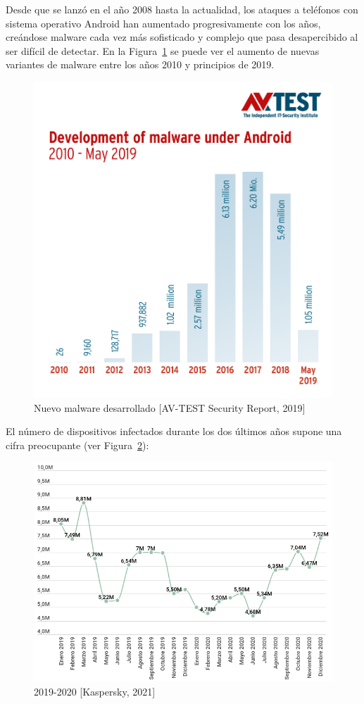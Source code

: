 Desde que se lanzó en el año 2008 hasta la actualidad, los ataques a teléfonos con sistema operativo Android han aumentado progresivamente con los años, creándose malware cada vez más sofisticado y complejo que pasa desapercibido al ser difícil de detectar. En la Figura~\ref{fig:avtest} se puede ver el aumento de nuevas variantes de malware entre los años 2010 y principios de 2019.

\begin{figure}[H]
\centering
	\includegraphics[scale=0.25]{img/2010-mayo2019.png}
	\caption{Nuevo malware desarrollado [AV-TEST Security Report, 2019]}
	\label{fig:avtest}
\end{figure}

El número de dispositivos infectados durante los dos últimos años supone una cifra preocupante (ver Figura~\ref{fig:infectados}):

\begin{figure}[H]
\centering
	\includegraphics[scale=0.35]{img/2019-2020.png}
	\caption{2019-2020 [Kaspersky, 2021]}
	\label{fig:infectados}
\end{figure}

